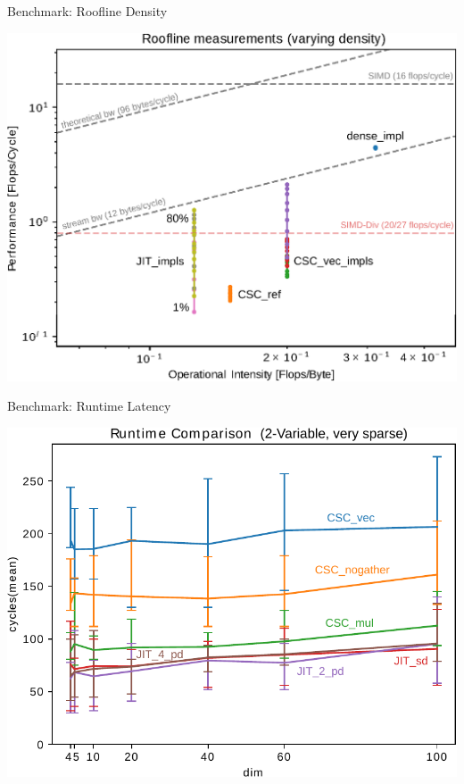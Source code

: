 \documentclass[table]{beamer}
\begin{document}
\begin{frame}{Benchmark: Roofline Density}
	\begin{center}
	    \includegraphics[scale=0.7]{plots/csc_jit_roofline.eps}
	\end{center}
\end{frame}


\begin{frame}{Benchmark: Runtime Latency}
	\begin{center}
	    \includegraphics[scale=0.7]{plots/2var_runtime.pdf}
	\end{center}
\end{frame}
\end{document}
